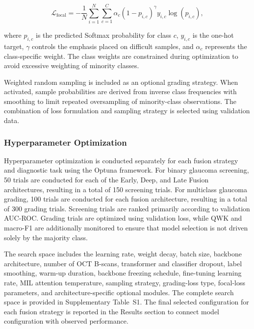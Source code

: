 \documentclass[preprint,12pt]{elsarticle}
\begin{document}
\begin{equation}
    \mathcal{L}_{\mathrm{focal}}
    =
    -\frac{1}{N}
    \sum_{i=1}^{N}
    \sum_{c=1}^{C}
    \alpha_c
    \left(1-p_{i,c}\right)^{\gamma}
    y_{i,c}\log(p_{i,c}),
    \label{eq:focal_loss}
\end{equation}

where $p_{i,c}$ is the predicted Softmax probability for class $c$, $y_{i,c}$ is the one-hot target, $\gamma$ controls the emphasis placed on difficult samples, and $\alpha_c$ represents the class-specific weight. The class weights are constrained during optimization to avoid excessive weighting of minority classes.

Weighted random sampling is included as an optional grading strategy. When activated, sample probabilities are derived from inverse class frequencies with smoothing to limit repeated oversampling of minority-class observations. The combination of loss formulation and sampling strategy is selected using validation data.

\subsubsection{Hyperparameter Optimization}
\label{subsubsec:hyperparameter_optimization}

Hyperparameter optimization is conducted separately for each fusion strategy and diagnostic task using the Optuna framework. For binary glaucoma screening, 50 trials are conducted for each of the Early, Deep, and Late Fusion architectures, resulting in a total of 150 screening trials. For multiclass glaucoma grading, 100 trials are conducted for each fusion architecture, resulting in a total of 300 grading trials. Screening trials are ranked primarily according to validation AUC-ROC. Grading trials are optimized using validation loss, while QWK and macro-F1 are additionally monitored to ensure that model selection is not driven solely by the majority class.

The search space includes the learning rate, weight decay, batch size, backbone architecture, number of OCT B-scans, transformer and classifier dropout, label smoothing, warm-up duration, backbone freezing schedule, fine-tuning learning rate, MIL attention temperature, sampling strategy, grading-loss type, focal-loss parameters, and architecture-specific optional modules. The complete search space is provided in Supplementary Table~S1. The final selected configuration for each fusion strategy is reported in the Results section to connect model configuration with observed performance.
\end{document}
